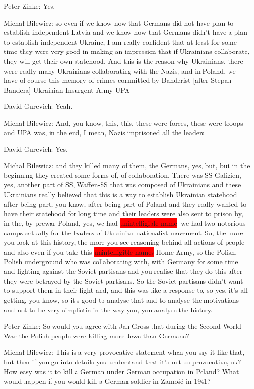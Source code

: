 Peter Zinke: Yes. 

Michał Bilewicz: so even if we know now that Germans did not have plan to establish independent Latvia and we know now that Germans didn't have a plan to establish independent Ukraine, I am really confident that at least for some time they were very good in making an impression that if Ukrainians collaborate, they will get their own statehood. And this is the reason why Ukrainians, there were really many Ukrainians collaborating with the Nazis, and in Poland, we have of course this memory of crimes committed by Banderist [after Stepan Bandera] Ukrainian Insurgent Army UPA

David Gurevich: Yeah. 

Michał Bilewicz: And, you know, this, this, these were forces, these were troops and UPA was, in the end, I mean, Nazis imprisoned all the leaders 

David Gurevich: Yes. 

Michał Bilewicz: and they killed many of them, the Germans, yes, but, but in the beginning they created some forms of, of collaboration. There was SS-Galizien, yes, another part of SS, Waffen-SS that was composed of Ukrainians and these Ukrainians really believed that this is a way to establish Ukrainian statehood after being part, you know, after being part of Poland and they really wanted to have their statehood for long time and their leaders were also sent to prison by, in the, by prewar Poland, yes, we had \colorbox{red}{unintelligible name}, we had two notorious camps actually for the leaders of Ukrainian nationalist movement. So, the more you look at this history, the more you see reasoning behind all actions of people and also even if you take this \colorbox{red}{unintelligible names}  Home Army, so the Polish, Polish underground who was collaborating with, with Germany for some time and fighting against the Soviet partisans and you realise that they do this after they were betrayed by the Soviet partisans. So the Soviet partisans didn't want to support them in their fight and, and this was like a response to, so yes, it's all getting, you know, so it's good to analyse that and to analyse the motivations and not to be very simplistic in the way you, you analyse the history. 

Peter Zinke: So would you agree with Jan Gross that during the Second World War the Polish people were killing more Jews than Germans? 

Michał Bilewicz: This is a very provocative statement when you say it like that, but then if you go into details you understand that it's not so provocative, ok? How easy was it to kill a German under German occupation in Poland? What would happen if you would kill a German soldier in Zamość in 1941?

